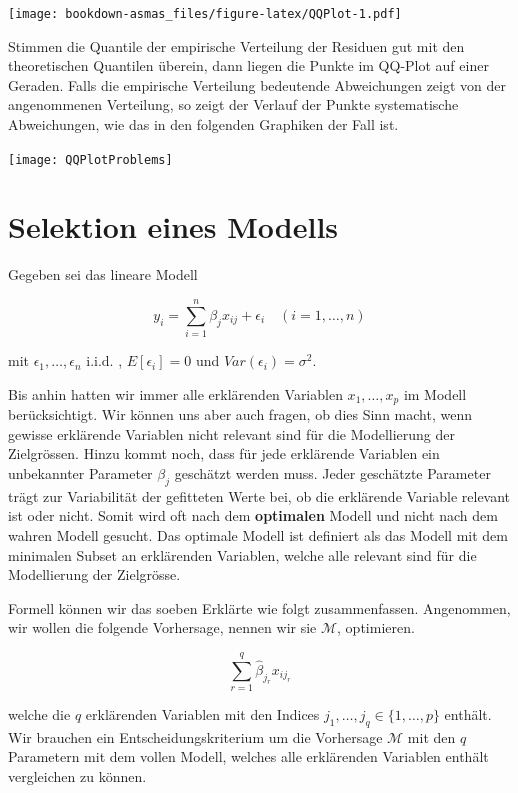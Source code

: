 \documentclass[]{book}
\begin{document}
\texttt{[image: bookdown-asmas\_files/figure-latex/QQPlot-1.pdf]}

Stimmen die Quantile der empirische Verteilung der Residuen gut mit den
theoretischen Quantilen überein, dann liegen die Punkte im QQ-Plot auf
einer Geraden. Falls die empirische Verteilung bedeutende Abweichungen
zeigt von der angenommenen Verteilung, so zeigt der Verlauf der Punkte
systematische Abweichungen, wie das in den folgenden Graphiken der Fall
ist.

\begin{center}\texttt{[image: QQPlotProblems]} \end{center}

\section{Selektion eines Modells}\label{selektion-eines-modells}

Gegeben sei das lineare Modell

\begin{equation}y_i = \sum_{i=1}^n \beta_j x_{ij} + \epsilon_i \quad (i = 1,\ldots,n)\end{equation}

mit \(\epsilon_1,\ldots,\epsilon_n \text{ i.i.d. }\),
\(E\left[\epsilon_i \right] = 0\) und \(Var(\epsilon_i) = \sigma^2\).

Bis anhin hatten wir immer alle erklärenden Variablen \(x_1,\ldots,x_p\)
im Modell berücksichtigt. Wir können uns aber auch fragen, ob dies Sinn
macht, wenn gewisse erklärende Variablen nicht relevant sind für die
Modellierung der Zielgrössen. Hinzu kommt noch, dass für jede erklärende
Variablen ein unbekannter Parameter \(\beta_j\) geschätzt werden muss.
Jeder geschätzte Parameter trägt zur Variabilität der gefitteten Werte
bei, ob die erklärende Variable relevant ist oder nicht. Somit wird oft
nach dem \textbf{optimalen} Modell und nicht nach dem wahren Modell
gesucht. Das optimale Modell ist definiert als das Modell mit dem
minimalen Subset an erklärenden Variablen, welche alle relevant sind für
die Modellierung der Zielgrösse.

Formell können wir das soeben Erklärte wie folgt zusammenfassen.
Angenommen, wir wollen die folgende Vorhersage, nennen wir sie
\(\mathcal{M}\), optimieren.

\begin{equation}\sum_{r=1}^q \hat{\beta}_{j_r}x_{ij_r}\end{equation}

welche die \(q\) erklärenden Variablen mit den Indices
\(j_1,\ldots,j_q \in \{1,\ldots,p\}\) enthält. Wir brauchen ein
Entscheidungskriterium um die Vorhersage \(\mathcal{M}\) mit den \(q\)
Parametern mit dem vollen Modell, welches alle erklärenden Variablen
enthält vergleichen zu können.
\end{document}
